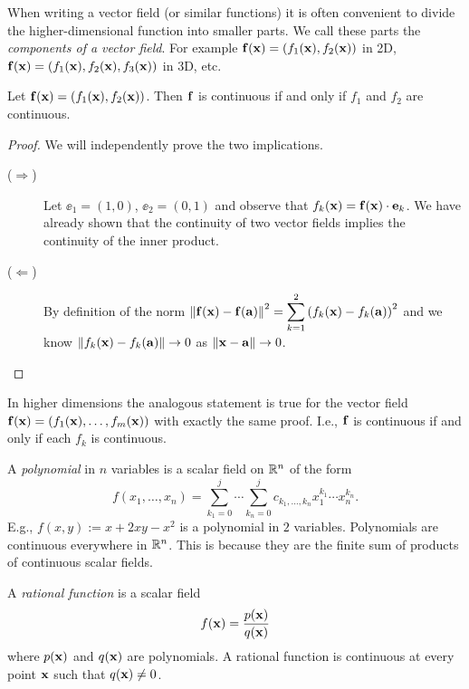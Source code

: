 When writing a vector field (or similar functions) it is often convenient to divide the higher-dimensional function into smaller parts.
We call these parts the \emph{components of a vector field}.
For example \(\mathbf{f}(\mathbf{x}) = \left(f_1(\mathbf{x}),f_2(\mathbf{x})\right)\) in 2D, \(\mathbf{f}(\mathbf{x}) = \left(f_1(\mathbf{x}),f_2(\mathbf{x}),f_3(\mathbf{x})\right)\) in 3D, etc.

\begin{theorem}
    Let \(\mathbf{f}(\mathbf{x}) = \left(f_1(\mathbf{x}),f_2(\mathbf{x})\right)\).
    Then \(\mathbf{f}\) is continuous if and only if \(f_1\) and \(f_2\) are continuous.
\end{theorem}
\begin{proof}
    We will independently prove the two implications.
    \begin{description}
        \item[(\(\Rightarrow\))]
              Let
              \( \ee_1=(1,0) \), \( \ee_2=(0,1) \)
              and observe that \(f_k(\mathbf{x}) = \mathbf{f}(\mathbf{x})\cdot \mathbf{e}_k\).
              We have already shown that the continuity of two vector fields implies the continuity of the inner product.
        \item[(\(\Leftarrow \))]
              By definition of the norm
              \(\left\|\mathbf{f}(\mathbf{x})-\mathbf{f}(\mathbf{a})\right\|^2 = \displaystyle\sum_{k=1}^{2}{(f_k(\mathbf{x})-f_k(\mathbf{a}))}^2\)
              and we know \(\left\|f_k(\mathbf{x})-f_k(\mathbf{a})\right\| \to 0\) as \(\left\|\mathbf{x}-\mathbf{a}\right\|\to 0\). \qedhere
    \end{description}
\end{proof}

In higher dimensions the analogous statement is true for the vector field \(\mathbf{f}(\mathbf{x}) = \left(f_1(\mathbf{x}),\ldots,f_m(\mathbf{x}) \right)\) with exactly the same proof.
I.e., \(\mathbf{f}\) is continuous if and only if each \(f_k\) is continuous.


\begin{example*}[polynomials]
    A  \emph{polynomial} in \(n\) variables is a scalar field on \(\mathbb{R}^n\) of the form
    \[
        f(x_1,\ldots,x_n)
        = \sum_{k_1=0}^{j}\cdots \sum_{k_n=0}^{j} c_{k_1,\dots,k_n} x_1^{k_1}\cdots x_n^{k_n}.
    \]
    E.g., \(f(x,y):= x + 2x y - x^2\) is a polynomial in \(2\) variables.
    Polynomials are continuous everywhere in \(\mathbb{R}^n\). This is because they are the finite sum of products of continuous scalar fields.
\end{example*}

\begin{example*}
    A  \emph{rational function} is a scalar field
    \[
        f(\mathbf{x})=\frac{p(\mathbf{x})}{q(\mathbf{x})}
    \]
    where \(p(\mathbf{x})\) and \(q(\mathbf{x})\) are polynomials.
    A rational function is continuous at every point \(\mathbf{x}\) such that \(q(\mathbf{x})\neq 0\).
\end{example*}

